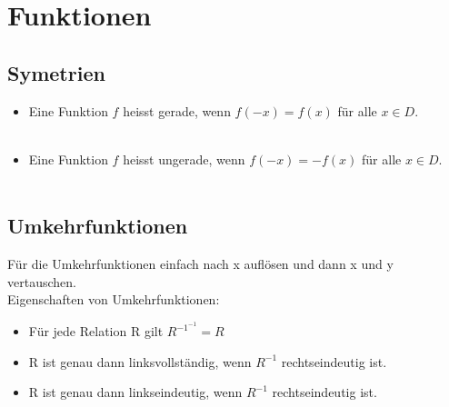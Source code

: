 \section{Funktionen}
\subsection{Symetrien}
\begin{itemize}
    \item Eine Funktion $f$ heisst gerade, wenn $f(-x) = f(x)$ für alle $x \in D$.\\\\
    \item Eine Funktion $f$ heisst ungerade, wenn $f(-x) = -f(x)$ für alle $x \in D$.\\\\
\end{itemize}
\subsection{Umkehrfunktionen}
Für die Umkehrfunktionen einfach nach x auflösen und dann x und y vertauschen.\\
Eigenschaften von Umkehrfunktionen:
\begin{itemize}
    \item Für jede Relation R gilt $R^{-1^{-1}} = R$
    \item R ist genau dann linksvollständig, wenn $R^{-1}$ rechtseindeutig ist.
    \item R ist genau dann linkseindeutig, wenn $R^{-1}$ rechtseindeutig ist.
\end{itemize}
